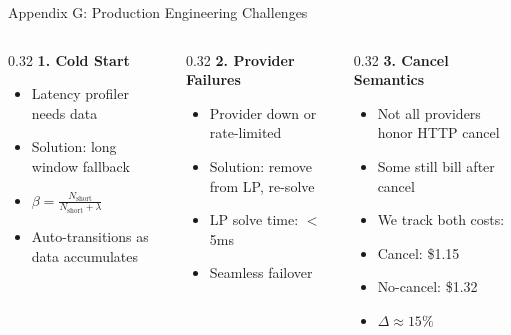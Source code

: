 \documentclass[aspectratio=169,10pt]{beamer}
\begin{document}
\begin{frame}[noframenumbering]
\hypertarget{app:q5}{}{Appendix G: Production Engineering Challenges}
\begin{columns}[T]
\begin{column}{0.32\textwidth}
\textbf{1. Cold Start}
\begin{itemize}\setlength{\itemsep}{2pt}
    \footnotesize
    \item Latency profiler needs data
    \item Solution: long window fallback
    \item $\beta = \frac{N_{\text{short}}}{N_{\text{short}} + \lambda}$
    \item Auto-transitions as data accumulates
\end{itemize}
\end{column}

\begin{column}{0.32\textwidth}
\textbf{2. Provider Failures}
\begin{itemize}\setlength{\itemsep}{2pt}
    \footnotesize
    \item Provider down or rate-limited
    \item Solution: remove from LP, re-solve
    \item LP solve time: $<$5ms
    \item Seamless failover
\end{itemize}
\end{column}

\begin{column}{0.32\textwidth}
\textbf{3. Cancel Semantics}
\begin{itemize}\setlength{\itemsep}{2pt}
    \footnotesize
    \item Not all providers honor HTTP cancel
    \item Some still bill after cancel
    \item We track both costs:
    \item Cancel: \$1.15
    \item No-cancel: \$1.32
    \item $\Delta \approx 15\%$
\end{itemize}
\end{column}
\end{columns}


\end{frame}
\end{document}
